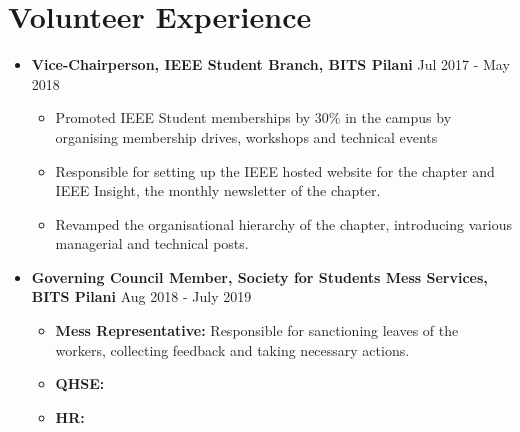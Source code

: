 \documentclass[a4paper]{article}
\newcommand{\resumeSubheading}[2]{
	\vspace{-1pt}\item
	{\textbf{\noindent #1}} \hfill {#2} \\
}
\newcommand{\resumeSubItemOneArg}[1]{\item \small #1\vspace{-1pt}}
\newcommand{\resumeSubHeadingListStart}{\begin{itemize}[leftmargin=*]}
\newcommand{\resumeSubHeadingListEnd}{\end{itemize}}
\newcommand{\resumeItemListStart}{\begin{itemize} \vspace*{-5pt}}
\newcommand{\resumeItemListEnd}{\end{itemize}}
\begin{document}


%
\section{Volunteer Experience}
\resumeSubHeadingListStart
\resumeSubheading
{Vice-Chairperson, IEEE Student Branch, BITS Pilani}{Jul 2017 - May 2018}
\resumeItemListStart \vspace{-12pt}
\resumeSubItemOneArg{Promoted IEEE Student memberships by 30\% in the campus by organising membership drives, workshops and technical events}
\resumeSubItemOneArg{Responsible for setting up the IEEE hosted website for the chapter and IEEE Insight, the monthly newsletter of the chapter.}
\resumeSubItemOneArg{Revamped the organisational hierarchy of the chapter, introducing various managerial and technical posts.}
\resumeItemListEnd
	\vspace{-5pt}
\resumeSubheading
{Governing Council Member, Society for Students Mess Services, BITS Pilani}{Aug 2018 - July 2019}
\resumeItemListStart \vspace{-12pt}
\resumeSubItemOneArg{\textbf{Mess Representative:} Responsible for sanctioning leaves of the workers, collecting feedback and taking necessary actions.}
\resumeSubItemOneArg{\textbf{QHSE:}}{Drafted a QHSE framework for SSMS activities and conducted regular audits every semester.}
\resumeSubItemOneArg{\textbf{HR:}}{Responsible for performance appraisals, providing education/medical loans and  managing internal worker conflicts.}
\resumeItemListEnd

\resumeSubHeadingListEnd

\end{document}
